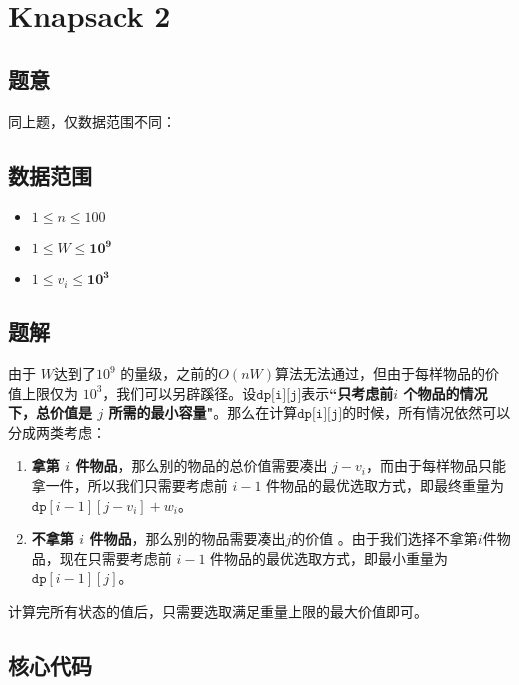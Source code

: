 \section{Knapsack 2}
\subsection*{题意}
同上题，仅数据范围不同：
\subsection*{数据范围}
\begin{itemize}
\item $1 \leq n \leq 100$
\item $1 \leq W \leq \bm{10^9}$
\item $1 \leq v_i \leq \bm{10^3}$
\end{itemize}

\subsection*{题解}

由于 $W$达到了$10^9$ 的量级，之前的$O(nW)$算法无法通过，但由于每样物品的价值上限仅为 $10^3$，我们可以另辟蹊径。设${\texttt{dp[i][j]}}$表示\textbf{``只考虑前$i$ 个物品的情况下，总价值是 $j$ 所需的最小容量"}。那么在计算${\texttt{dp[i][j]}}$的时候，所有情况依然可以分成两类考虑：
\begin{enumerate}
    \item \textbf{拿第 $i$ 件物品}，那么别的物品的总价值需要凑出 $j - v_i$，而由于每样物品只能拿一件，所以我们只需要考虑前 $i-1$ 件物品的最优选取方式，即最终重量为 ${\texttt{dp}}[i-1][j-v_i] + w_i$。
    \item \textbf{不拿第 $i$ 件物品}，那么别的物品需要凑出$j$的价值 。由于我们选择不拿第$i$件物品，现在只需要考虑前 $i-1$ 件物品的最优选取方式，即最小重量为 ${\texttt{dp}}[i-1][j]$。
\end{enumerate}
计算完所有状态的值后，只需要选取满足重量上限的最大价值即可。
\subsection*{核心代码}
\inputminted[linenos,autogobble]{cpp}{../Code/E.cpp}
\newpage